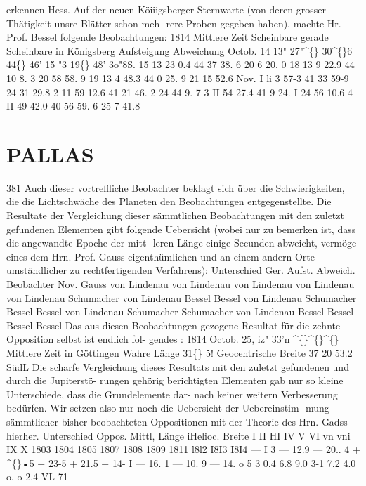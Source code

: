 \documentclass[12pt,a4paper]{article}
\newcommand{\degree}{\textdegree}
\begin{document}
erkennen  Hess. 
Auf  der  neuen  Köiiigsberger  Sternwarte  (von  deren  grosser  Thätigkeit  unsre  Blätter  schon  meh- 
rere Proben  gegeben  haben),  machte  Hr.  Prof.  Bessel  folgende  Beobachtungen: 
1814 
Mittlere  Zeit 
Scheinbare  gerade 
Scheinbare 
in  Königsberg 
Aufsteigung 
Abweichung 
Octob.  14 
13"  27"\textasciicircum\{\}  30\textasciicircum\{\}6 
44\degree\{\}  46'    15 "3 
19\degree\{\}  48'    3o"8S. 
15 
13     23      0.4 
44     37     38. 6 
20       6     20. 0 
18 
13      9     22.9 
44     10       8.  3 
20     58     58.  9 
19 
13       4     48.3 
44       0     25. 9 
21     15     52.6 
Nov.      I 
li       3     57-3 
41     33     59-9 
24     31     29.8 
2 
11     59     12.6 
41        21       46.  2 
24     44       9. 7 
3 
II     54     27.4 
41          9       24.  I 
24     56     10.6 
4 
II     49     42.0 
40     56     59. 6 
25       7     41.8 


\newpage

\section*{PALLAS}
381 
Auch  dieser  vortreffliche  Beobachter  beklagt  sich  über  die  Schwierigkeiten,  die  die  Lichtschwäche 
des  Planeten  den  Beobachtungen  entgegenstellte. 
Die  Resultate  der  Vergleichung  dieser  sämmtlichen  Beobachtungen  mit  den  zuletzt  gefundenen 
Elementen  gibt  folgende  Uebersicht  (wobei  nur  zu  bemerken  ist,  dass  die  angewandte  Epoche  der  mitt- 
leren Länge  einige  Secunden  abweicht,  vermöge  eines  dem  Hrn.  Prof.  Gauss  eigenthümlichen  und  an 
einem  andern  Orte  umständlicher  zu  rechtfertigenden  Verfahrens): 
Unterschied 
Ger.  Aufst.    Abweich.       Beobachter 
Nov. 
Gauss 
von  Lindenau 
von  Lindenau 
von  Lindenau 
von  Lindenau 
von  Lindenau 
Schumacher 
von  Lindenau 
Bessel 
Bessel 
von  Lindenau 
Schumacher 
Bessel 
Bessel 
von  Lindenau 
Schumacher 
Schumacher 
von  Lindenau 
Bessel 
Bessel 
Bessel 
Bessel 
Das  aus  diesen  Beobachtungen  gezogene  Resultat  für  die  zehnte  Opposition  selbst  ist  endlich  fol- 
gendes : 
1814  Octob.  25,  iz"  33'n  \textasciicircum\{\}\textasciicircum\{\}\textasciicircum\{\}  Mittlere  Zeit  in  Göttingen 
Wahre  Länge   
31\degree\{\}  5! 
Geocentrische  Breite   
37    20    53.2  SüdL 
Die  scharfe  Vergleichung  dieses  Resultats  mit  den  zuletzt  gefundenen  und  durch  die  Jupiterstö- 
rungen gehörig  berichtigten  Elementen  gab  nur  so  kleine  Unterschiede,  dass  die  Grundelemente  dar- 
nach  keiner  weitern  Verbesserung  bedürfen.  Wir  setzen  also  nur  noch  die  Uebersicht  der  Uebereinstim- 
mung  sämmtlicher  bisher  beobachteten  Oppositionen  mit  der  Theorie  des  Hrn.  Gadss  hierher. 
Unterschied 
Oppos.  Mittl,  Länge iHelioc.  Breite 
I 
II 
HI 
IV 
V 
VI 
vn 
vni 
IX 
X 
1803 
1804 
1805 
1807 
1808 
1809 
1811 
l8l2 
I8I3 
I8I4 
---  I  3 
---  12.9 
---  20..  4 
+  \textasciicircum\{\}•5 
+  23-5 
+  21.5 
+  14-  I 
---  16. 1 
---  10.  9 
---  14.  o 
5  3 
0.4 
6.8 
9.0 
3-1 
7.2 
4.0 
o.  o 
2.4 
VL 
71 
\end{document}
